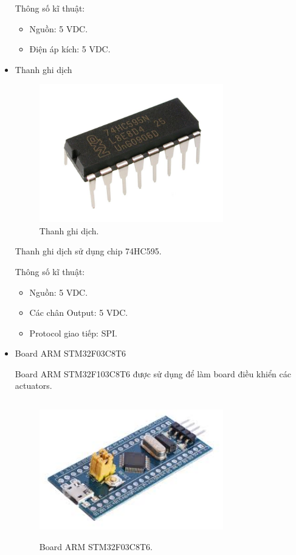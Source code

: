 \documentclass[a4paper,12pt,oneside]{article}
\begin{document}
\begin{itemize}
\noindent Thông số kĩ thuật:
\begin{itemize}
	\item Nguồn: 5 VDC.
	\item Điện áp kích: 5 VDC.
\end{itemize}

\item Thanh ghi dịch\\
\begin{figure}[h!]
\centering
\includegraphics[height=6cm,width=8cm]{hinh/Register.jpg}
\caption{Thanh ghi dịch.}
\end{figure}
\noindent Thanh ghi dịch sử dụng chip 74HC595.

\noindent Thông số kĩ thuật:
\begin{itemize}
	\item Nguồn: 5 VDC.
	\item Các chân Output: 5 VDC.
	\item Protocol giao tiếp: SPI.
\end{itemize}


\item Board ARM STM32F03C8T6

\noindent Board ARM STM32F103C8T6 được sử dụng để làm board điều khiển các actuators.

\begin{figure}[h!]
\centering
\includegraphics[height=6cm,width=8cm]{hinh/stm32.jpg}
\caption{Board ARM STM32F03C8T6.}
\end{figure}


\end{itemize}
\end{document}
